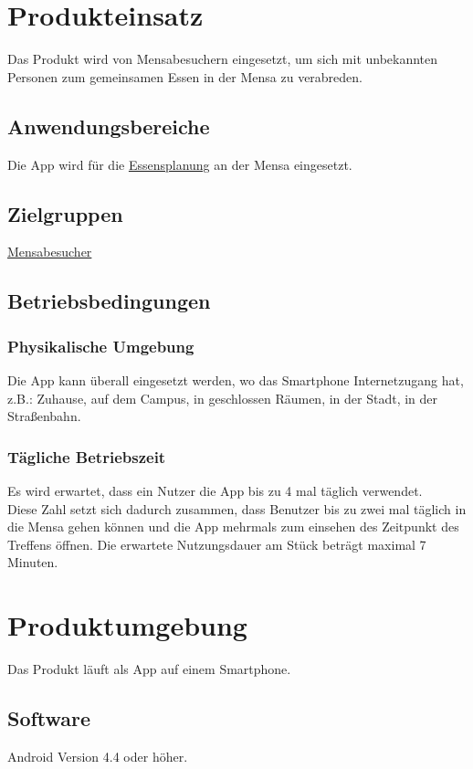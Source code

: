 \documentclass[a4paper]{scrreprt}
\begin{document}
\chapter{Produkteinsatz}
Das Produkt wird von Mensabesuchern eingesetzt, um sich mit unbekannten Personen zum gemeinsamen Essen in der Mensa zu verabreden.

 
\section{Anwendungsbereiche}
Die App wird für die \hyperlink{label3}{Essensplanung} an der Mensa eingesetzt.
 
\section{Zielgruppen}
\hyperlink{label1}{Mensabesucher}
 
\section{Betriebsbedingungen}
\subsection{Physikalische Umgebung}
Die App kann überall eingesetzt werden, wo das Smartphone Internetzugang hat,
z.B.: Zuhause, auf dem Campus, in geschlossen Räumen, in der Stadt, in der Straßenbahn.

\subsection{Tägliche Betriebszeit}
Es wird erwartet, dass ein Nutzer die App bis zu 4 mal täglich verwendet. \\
Diese Zahl setzt sich dadurch zusammen, dass Benutzer bis zu zwei mal täglich in die Mensa gehen können und die App mehrmals zum einsehen des Zeitpunkt des Treffens öffnen. Die erwartete Nutzungsdauer am Stück beträgt maximal 7 Minuten.
 
\chapter{Produktumgebung}
Das Produkt läuft als App auf einem Smartphone.

\section{Software}
Android Version 4.4 oder höher.
 
\end{document}
